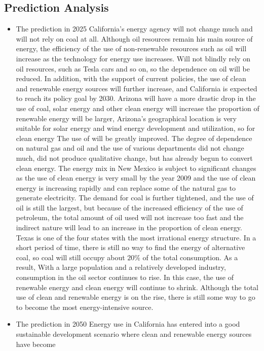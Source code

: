 \documentclass{mcmthesis}
\begin{document}
\subsection{Prediction Analysis}
\begin{itemize}
  \item The prediction in 2025
  California's energy agency will not change much and will not rely on coal at all.
  Although oil resources remain his main source of energy, the efficiency of the use of non-renewable resources such as oil will increase as the technology for energy use increases.
  Will not blindly rely on oil resources, such as Tesla cars and so on, so the dependence on oil will be reduced.
  In addition, with the support of current policies, the use of clean and renewable energy sources will further increase, and California is expected to reach its policy goal by 2030.
  Arizona will have a more drastic drop in the use of coal, solar energy and other clean energy will increase the proportion of renewable energy will be larger,
  Arizona's geographical location is very suitable for solar energy and wind energy development and utilization, so for clean energy The use of will be greatly improved.
  The degree of dependence on natural gas and oil and the use of various departments did not change much, did not produce qualitative change, but has already begun to convert clean energy.
  The energy mix in New Mexico is subject to significant changes as the use of clean energy is very small by the year 2009 and the use of clean energy is increasing rapidly and can
  replace some of the natural gas to generate electricity. The demand for coal is further tightened, and the use of oil is still the largest, but because of the increased efficiency of
  the use of petroleum, the total amount of oil used will not increase too fast and the indirect nature will lead to an increase in the proportion of clean energy.
  Texas is one of the four states with the most irrational energy structure. In a short period of time, there is still no way to find the energy of alternative coal,
  so coal will still occupy about $20\%$ of the total consumption. As a result, With a large population and a relatively developed industry,
  consumption in the oil sector continues to rise. In this case, the use of renewable energy and clean energy will continue to shrink.
  Although the total use of clean and renewable energy is on the rise, there is still some way to go to become the most energy-intensive source.
  \item The prediction in 2050
  Energy use in California has entered into a good sustainable development scenario where clean and renewable energy sources have become

\end{itemize}
\end{document}
